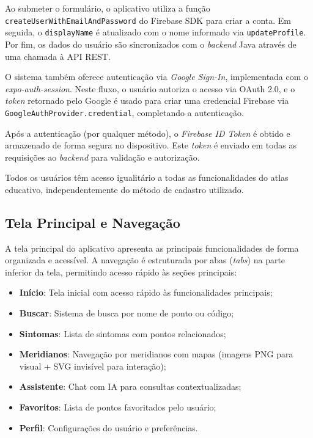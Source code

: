 Ao submeter o formulário, o aplicativo utiliza a função \texttt{createUserWithEmailAndPassword} do Firebase SDK para criar a conta. Em seguida, o \texttt{displayName} é atualizado com o nome informado via \texttt{updateProfile}. Por fim, os dados do usuário são sincronizados com o \textit{backend} Java através de uma chamada à API REST.

O sistema também oferece autenticação via \textit{Google Sign-In}, implementada com o \textit{expo-auth-session}. Neste fluxo, o usuário autoriza o acesso via OAuth 2.0, e o \textit{token} retornado pelo Google é usado para criar uma credencial Firebase via \texttt{GoogleAuthProvider.credential}, completando a autenticação.

Após a autenticação (por qualquer método), o \textit{Firebase ID Token} é obtido e armazenado de forma segura no dispositivo. Este \textit{token} é enviado em todas as requisições ao \textit{backend} para validação e autorização.

Todos os usuários têm acesso igualitário a todas as funcionalidades do atlas educativo, independentemente do método de cadastro utilizado.

\subsection{Tela Principal e Navegação}

A tela principal do aplicativo apresenta as principais funcionalidades de forma organizada e acessível. A navegação é estruturada por abas (\textit{tabs}) na parte inferior da tela, permitindo acesso rápido às seções principais:

\begin{itemize}
    \item \textbf{Início}: Tela inicial com acesso rápido às funcionalidades principais;
    \item \textbf{Buscar}: Sistema de busca por nome de ponto ou código;
    \item \textbf{Sintomas}: Lista de sintomas com pontos relacionados;
    \item \textbf{Meridianos}: Navegação por meridianos com mapas (imagens PNG para visual + SVG invisível para interação);
    \item \textbf{Assistente}: Chat com IA para consultas contextualizadas;
    \item \textbf{Favoritos}: Lista de pontos favoritados pelo usuário;
    \item \textbf{Perfil}: Configurações do usuário e preferências.
\end{itemize}

